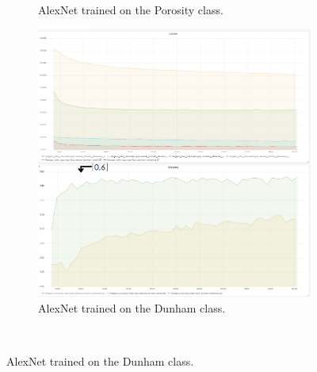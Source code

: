 \begin{figure}
{\begin{subfigure}[b]{.6\textwidth}
\caption{AlexNet trained on the Porosity class.}
\label{fig:alexinit_poro}
\end{subfigure}%
\begin{subfigure}[b]{.6\textwidth}
\centering
\includegraphics[width=.95\textwidth]{figures/04-Init_al_dunham_acc.PNG}
\caption{AlexNet trained on the Dunham class.}
\label{fig:alexinit_dunham}
\end{subfigure}%
}\\
\end{figure}
